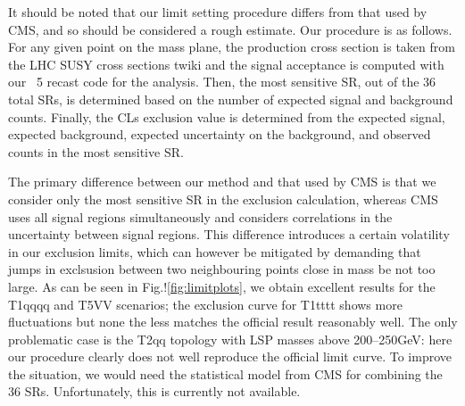 It should be noted that our limit setting procedure differs from that used by CMS, and so should be 
considered a rough estimate. Our procedure is as follows. For any given point
on the mass plane, the production cross section is taken from the LHC SUSY cross sections twiki 
and the signal acceptance is computed with our {}~5 recast code for the analysis.
Then, the most sensitive SR, out of the 36 total SRs, is determined based on the 
number of expected signal and background counts. 
Finally, the CLs exclusion value is determined from the expected signal, expected
background, expected uncertainty on the background, and observed counts in the most sensitive
SR. 

The primary difference between our method and that used by CMS is that we consider only the most sensitive SR
in the exclusion calculation, whereas CMS uses all signal regions simultaneously and considers correlations
in the uncertainty between signal regions. This difference introduces a certain volatility in our  
exclusion limits, which can however be mitigated by demanding that jumps in exclsusion between two 
neighbouring points close in mass be not too large. 
As can be seen in Fig.!\ref{fig:limitplots}, we obtain excellent results for the T1qqqq and T5VV scenarios; the 
exclusion curve for T1tttt shows more fluctuations but none the less matches the official result reasonably well. 
The only problematic case is the T2qq topology with LSP masses above 200--250GeV: here our procedure 
clearly does not well reproduce the official limit curve. To improve the situation, we would need the  
statistical model from CMS for combining  the 36 SRs. Unfortunately, this is currently not available.   


